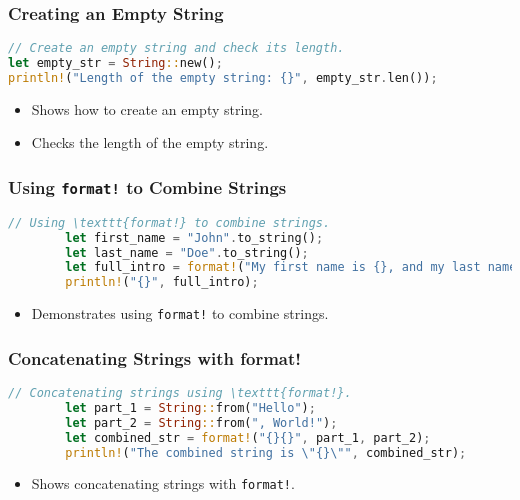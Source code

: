 \documentclass[aspectratio=169, table]{beamer}
\begin{document}
\begin{frame}[fragile]
\frametitle{Creating an Empty String}
\begin{lstlisting}[language=Rust]
// Create an empty string and check its length.
let empty_str = String::new();
println!("Length of the empty string: {}", empty_str.len());
\end{lstlisting}
\begin{itemize}
\item Shows how to create an empty string.
\item Checks the length of the empty string.
\end{itemize}
\end{frame}

\begin{frame}[fragile]
	\frametitle{Using \texttt{format!} to Combine Strings}
	\begin{lstlisting}[language=Rust]
		// Using \texttt{format!} to combine strings.
		let first_name = "John".to_string();
		let last_name = "Doe".to_string();
		let full_intro = format!("My first name is {}, and my last name is {}", first_name, last_name);
		println!("{}", full_intro);
	\end{lstlisting}
	\begin{itemize}
		\item Demonstrates using \texttt{format!} to combine strings.
	\end{itemize}
\end{frame}

\begin{frame}[fragile]
	\frametitle{Concatenating Strings with format!}
	\begin{lstlisting}[language=Rust]
		// Concatenating strings using \texttt{format!}.
		let part_1 = String::from("Hello");
		let part_2 = String::from(", World!");
		let combined_str = format!("{}{}", part_1, part_2);
		println!("The combined string is \"{}\"", combined_str);
	\end{lstlisting}
	\begin{itemize}
		\item Shows concatenating strings with \texttt{format!}.
	\end{itemize}
\end{frame}
\end{document}
